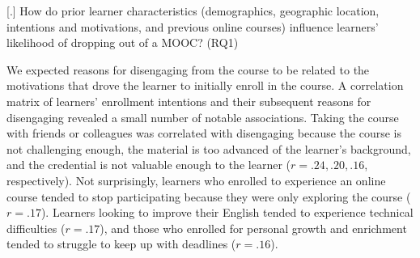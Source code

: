 \documentclass{sigchi}\usepackage[]{graphicx}\usepackage[]{color}
\begin{document}
[.] How do prior learner characteristics (demographics, geographic location, intentions and motivations, and previous online courses) influence learners' likelihood of dropping out of a MOOC? (RQ1)


We expected reasons for disengaging from the course to be related to the motivations that drove the learner to initially enroll in the course. A correlation matrix of learners' enrollment intentions and their subsequent reasons for disengaging revealed a small number of notable associations. Taking the course with friends or colleagues was correlated with disengaging because the course is not challenging enough, the material is too advanced of the learner's background, and the credential is not valuable enough to the learner ($r=.24, .20, .16$, respectively). Not surprisingly, learners who enrolled to experience an online course tended to stop participating because they were only exploring the course ($r=.17$). Learners looking to improve their English tended to experience technical difficulties ($r=.17$), and those who enrolled for personal growth and enrichment tended to struggle to keep up with deadlines ($r=.16$).

\end{document}
